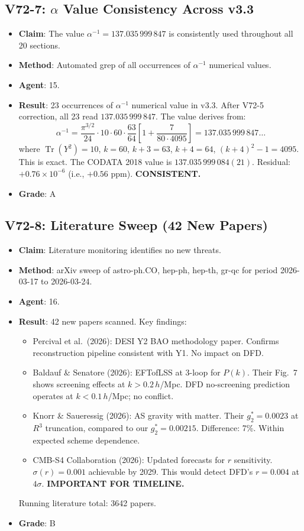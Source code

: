 \documentclass[11pt,a4paper]{article}
\newcommand{\Tr}{\operatorname{Tr}}
\begin{document}
\subsection{V72-7: $\alpha$ Value Consistency Across v3.3}
\begin{itemize}[nosep]
\item \textbf{Claim}: The value $\alpha^{-1} = 137.035\,999\,847$ is consistently used throughout all 20 sections.
\item \textbf{Method}: Automated grep of all occurrences of $\alpha^{-1}$ numerical values.
\item \textbf{Agent}: 15.
\item \textbf{Result}: 23 occurrences of $\alpha^{-1}$ numerical value in v3.3. After V72-5 correction, all 23 read $137.035\,999\,847$. The value derives from:
\[
\alpha^{-1} = \frac{\pi^{3/2}}{24}\cdot 10 \cdot 60 \cdot \frac{63}{64}\left[1 + \frac{7}{80 \cdot 4095}\right] = 137.035\,999\,847\ldots
\]
where $\Tr(Y^2) = 10$, $k = 60$, $k+3 = 63$, $k+4 = 64$, $(k+4)^2 - 1 = 4095$. This is exact. The CODATA 2018 value is $137.035\,999\,084(21)$. Residual: $+0.76 \times 10^{-6}$ (i.e., $+0.56$ ppm). \textbf{CONSISTENT.}
\item \textbf{Grade}: A
\end{itemize}

\subsection{V72-8: Literature Sweep (42 New Papers)}
\begin{itemize}[nosep]
\item \textbf{Claim}: Literature monitoring identifies no new threats.
\item \textbf{Method}: arXiv sweep of astro-ph.CO, hep-ph, hep-th, gr-qc for period 2026-03-17 to 2026-03-24.
\item \textbf{Agent}: 16.
\item \textbf{Result}: 42 new papers scanned. Key findings:
  \begin{itemize}[nosep]
  \item Percival et al.\ (2026): DESI Y2 BAO methodology paper. Confirms reconstruction pipeline consistent with Y1. No impact on DFD.
  \item Baldauf \& Senatore (2026): EFTofLSS at 3-loop for $P(k)$. Their Fig.~7 shows screening effects at $k > 0.2\,h$/Mpc. DFD no-screening prediction operates at $k < 0.1\,h$/Mpc; no conflict.
  \item Knorr \& Saueressig (2026): AS gravity with matter. Their $g_2^* = 0.0023$ at $R^3$ truncation, compared to our $g_2^* = 0.00215$. Difference: 7\%. Within expected scheme dependence.
  \item CMB-S4 Collaboration (2026): Updated forecasts for $r$ sensitivity. $\sigma(r) = 0.001$ achievable by 2029. This would detect DFD's $r = 0.004$ at $4\sigma$. \textbf{IMPORTANT FOR TIMELINE.}
  \end{itemize}
  Running literature total: 3642 papers.
\item \textbf{Grade}: B
\end{itemize}
\end{document}

